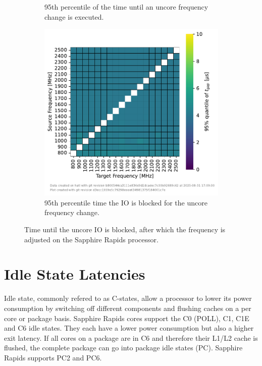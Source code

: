 \begin{figure}[]
\begin{subfigure}[t]{0.3\linewidth}
        \caption{\label{fig:ufs_init_95}95th percentile of the time until an uncore frequency change is executed.}
    \end{subfigure}
    \hfill
    \begin{subfigure}[t]{0.3\linewidth}
        \centering
        \includegraphics[width=\linewidth]{fig/uncore-frequency-switching-latency/95percentile-t-gap.pdf}
        \caption{\label{fig:ufs_gap_95}95th percentile time the IO is blocked for the uncore frequency change.}
    \end{subfigure}
    \caption{Time until the uncore IO is blocked, after which the frequency is adjusted on the Sapphire Rapids processor.}
\end{figure}

\section{Idle State Latencies}
\label{sec:idle_state_latencies}

Idle state, commonly refered to as C-states, allow a processor to lower its power consumption by switching off different components and flushing caches on a per core or package basis.
Sapphire Rapids cores support the C0 (POLL), C1, C1E and C6 idle states.
They each have a lower power consumption but also a higher exit latency.
If all cores on a package are in C6 and therefore their L1/L2 cache is flushed, the complete package can go into package idle states (PC).
Sapphire Rapids supports PC2 and PC6.

